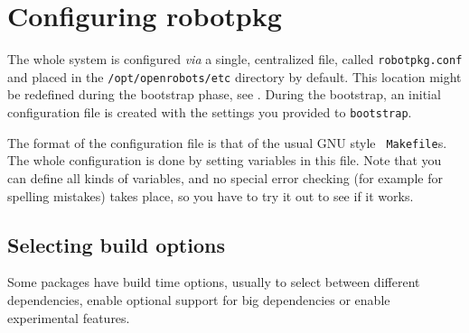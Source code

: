 %
%
%
%
%

\section{Configuring robotpkg} %
\label{section:configuring}

The whole \robotpkg system is configured  {\em via} a single, centralized file,
called {\tt   robotpkg.conf}  and  placed  in  the   {\tt  /opt/openrobots/etc}
directory  by default.  This location  might be redefined  during the bootstrap
phase,  see  .
During    the  bootstrap, an initial configuration     file is created with the
settings you provided to {\tt bootstrap}.

The  format of  the configuration file   is that of   the usual GNU style  {\tt
Makefile}s. The whole \robotpkg configuration  is done by setting variables  in
this  file. Note that  you can  define all  kinds of  variables, and no special
error checking (for example for spelling mistakes)  takes place, so you have to
try it out to see if it works.


\subsection{Selecting build options} %
\label{section:configuring:build_options}

Some packages have   build time options, usually   to select between  different
dependencies,  enable  optional   support for    big   dependencies or   enable
experimental features.

